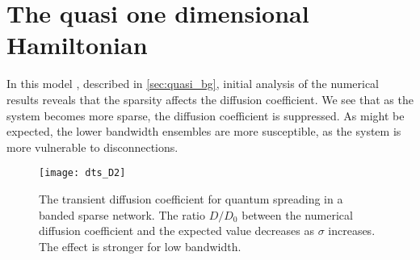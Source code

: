 \section{The quasi one dimensional Hamiltonian}


In this model , described in \autoref{sec:quasi_bg}, initial analysis of
the numerical results reveals that the sparsity affects the diffusion coefficient.
We see that as the system becomes more sparse, the diffusion coefficient is suppressed. 
As might be expected, the lower bandwidth ensembles are more
susceptible, as the system is more vulnerable to disconnections.



\begin{figure}
\texttt{[image: dts\_D2]}
\caption{The transient diffusion coefficient for quantum spreading in
a banded sparse network. The ratio $D/D_0$ between the numerical diffusion 
coefficient and the expected value decreases as $\sigma$ increases. The effect
is stronger for low bandwidth.}
\end{figure}
